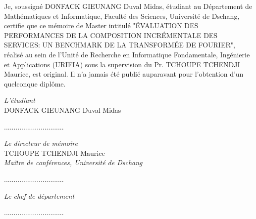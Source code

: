 
Je, soussigné DONFACK GIEUNANG Duval Midas, étudiant au Département de Mathématiques et Informatique, Faculté des Sciences, Université de Dschang, certifie que ce mémoire de Master intitulé "ÉVALUATION DES PERFORMANCES DE LA COMPOSITION INCRÉMENTALE DES SERVICES: UN BENCHMARK DE LA TRANSFORMÉE DE FOURIER", réalisé au sein de l'Unité de Recherche en Informatique Fondamentale, Ingénierie et Applications (URIFIA) sous la supervision du Pr. TCHOUPE TCHENDJI Maurice, est original. Il n'a jamais été publié auparavant pour l'obtention d'un quelconque diplôme.

\vspace{1cm}
\vspace{1cm}
\begin{center}
\textit{L'étudiant} \\
DONFACK GIEUNANG Duval Midas \\
\vspace{1cm}

............................... \\
\vspace{1cm}

\textit{Le directeur de mémoire} \\
TCHOUPE TCHENDJI Maurice \\
\textit{Maître de conférences, Université de Dschang} \\
\vspace{1cm}

...............................

\vspace{1cm}
\textit{Le chef de département} \\

\vspace{1cm}

...............................
\end{center}